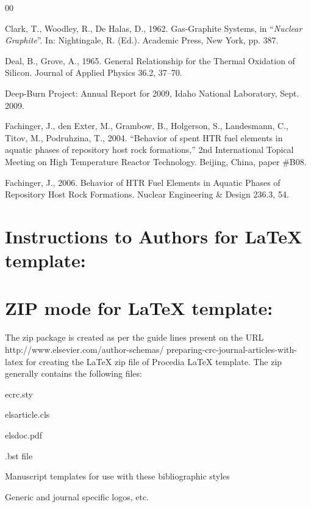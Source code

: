 \documentclass[5p,times,procedia]{elsarticle}
\begin{document}
 \begin{thebibliography}{00}


Clark, T., Woodley, R., De Halas, D., 1962. Gas-Graphite Systems, in ``{\it Nuclear Graphite}''. 
In: Nightingale, R. (Ed.). Academic Press, New York, pp. 387.

Deal, B., Grove, A., 1965. General Relationship for the Thermal Oxidation of Silicon. Journal of Applied Physics 36.2, 37--70.

Deep-Burn Project: Annual Report for 2009, Idaho National Laboratory, Sept. 2009.

Fachinger, J., den Exter, M., Grambow, B., Holgerson, S., Landesmann, C., Titov, M., Podruhzina, T., 2004. ``Behavior of spent HTR fuel elements in aquatic phases of repository host rock formations,'' 2nd International Topical Meeting on High Temperature Reactor Technology. Beijing, China, paper \#B08. 

Fachinger, J., 2006. Behavior
of HTR Fuel Elements in Aquatic Phases of Repository Host Rock Formations. Nuclear Engineering \& Design 236.3,      54.

 \end{thebibliography}

\clearpage\onecolumn

\normalMode

\section*{Instructions to Authors for LaTeX template:}

\section{ZIP mode for LaTeX template:}

The zip package is created as per the guide lines present on the URL http://www.elsevier.com/author-schemas/ preparing-crc-journal-articles-with-latex for creating the LaTeX zip file of Procedia LaTeX template.  The zip generally contains the following files:
\begin{Itemize}[]\leftskip-12.7pt
\item ecrc.sty
\item  elsarticle.cls
\item elsdoc.pdf
\item .bst file
\item Manuscript templates for use with these bibliographic styles
\item  Generic and journal specific logos, etc.
\end{Itemize}
\end{document}
